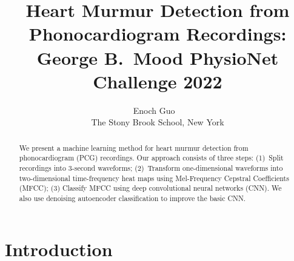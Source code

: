 \documentclass[twocolumn]{cinc}
\begin{document}


\title{Heart Murmur Detection from Phonocardiogram Recordings: \\
George B.\ Mood PhysioNet Challenge 2022}


\author {Enoch Guo
\ \\ %
  The Stony Brook School, New York}

\maketitle
\begin{abstract}

We present a machine learning method for heart murmur detection from phonocardiogram (PCG) recordings. Our approach consists of three steps: (1)~Split recordings into 3-second waveforms; (2)~Transform one-dimensional waveforms into two-dimensional time-frequency heat maps using Mel-Frequency Cepstral Coefficients (MFCC); (3) Classify MFCC using deep convolutional neural networks (CNN). We also use denoising autoencoder classification to improve the basic CNN.

\end{abstract}

\section{Introduction}
\end{document}
